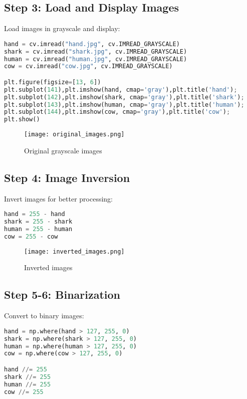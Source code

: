 \documentclass[12pt]{article}
\begin{document}
\subsection{Step 3: Load and Display Images}
Load images in grayscale and display:
\begin{lstlisting}[language=Python]
hand = cv.imread("hand.jpg", cv.IMREAD_GRAYSCALE)
shark = cv.imread("shark.jpg", cv.IMREAD_GRAYSCALE)
human = cv.imread("human.jpg", cv.IMREAD_GRAYSCALE)
cow = cv.imread("cow.jpg", cv.IMREAD_GRAYSCALE)

plt.figure(figsize=[13, 6])
plt.subplot(141),plt.imshow(hand, cmap='gray'),plt.title('hand');
plt.subplot(142),plt.imshow(shark, cmap='gray'),plt.title('shark');
plt.subplot(143),plt.imshow(human, cmap='gray'),plt.title('human');
plt.subplot(144),plt.imshow(cow, cmap='gray'),plt.title('cow');
plt.show()
\end{lstlisting}

\begin{figure}[H]
    \centering
    \texttt{[image: original\_images.png]}
    \caption{Original grayscale images}
    \label{fig:original}
\end{figure}

\subsection{Step 4: Image Inversion}
Invert images for better processing:
\begin{lstlisting}[language=Python]
hand = 255 - hand
shark = 255 - shark
human = 255 - human
cow = 255 - cow
\end{lstlisting}

\begin{figure}[H]
    \centering
    \texttt{[image: inverted\_images.png]}
    \caption{Inverted images}
    \label{fig:inverted}
\end{figure}

\subsection{Step 5-6: Binarization}
Convert to binary images:
\begin{lstlisting}[language=Python]
hand = np.where(hand > 127, 255, 0)
shark = np.where(shark > 127, 255, 0)
human = np.where(human > 127, 255, 0)
cow = np.where(cow > 127, 255, 0)

hand //= 255
shark //= 255
human //= 255
cow //= 255
\end{lstlisting}
\end{document}
